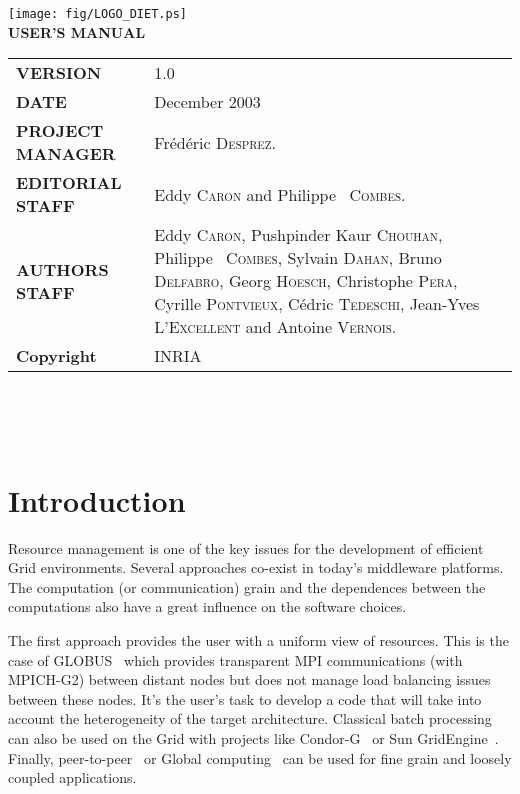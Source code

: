 \documentclass[12pt,a4paper]{book}
\begin{document}

\thispagestyle{empty}
\vspace*{3cm}
\vspace*{3cm}

\begin{center}
\texttt{[image: fig/LOGO\_DIET.ps]}\\[2ex]
\textbf{\Huge USER'S MANUAL\\[2ex]}
\end{center}

\vfill


\noindent
\small{
\begin{tabular}{ll}
  \textbf{VERSION}  & 1.0\\
  \textbf{DATE}     & December 2003\\
  \textbf{PROJECT MANAGER}  & Fr\'ed\'eric \textsc{Desprez}.\\
  \textbf{EDITORIAL STAFF}  & Eddy \textsc{Caron} and Philippe ~\textsc{Combes}.\\
  \textbf{AUTHORS STAFF}    & 
\begin{minipage}[t]{12cm}
  Eddy \textsc{Caron}, Pushpinder Kaur \textsc{Chouhan}, Philippe ~\textsc{Combes},
  Sylvain \textsc{Dahan}, Bruno \textsc{Delfabro}, Georg \textsc{Hoesch}, Christophe \textsc{Pera}, Cyrille \textsc{Pontvieux}, C\'edric \textsc{Tedeschi}, Jean-Yves \textsc{L'Excellent} and Antoine \textsc{Vernois}.
\end{minipage} \\
  \textbf{Copyright}& INRIA
\end{tabular}\\
}

\newpage
\thispagestyle{empty}
\ 



\newpage
\tableofcontents


%
%
\newpage
{}
\chapter*{Introduction}

Resource management is one of the key issues for the development of efficient Grid environments. Several approaches co-exist in today's middleware platforms. The computation (or communication) grain and the dependences between the computations also have a great influence on the software choices.

The first approach provides the user with a uniform view of resources. This is the case of GLOBUS~\cite{Globus} which provides transparent MPI communications (with MPICH-G2) between distant nodes but does not manage load balancing issues between these nodes. It's the user's task to develop a code that will take into account the heterogeneity of the target architecture. Classical batch processing can also be used on the Grid with projects like Condor-G~\cite{Condor} or Sun GridEngine~\cite{SunGridEngine}. Finally, peer-to-peer~\cite{Oram01} or Global computing~\cite{germain01global} can be used for fine grain and loosely coupled applications.
\end{document}
